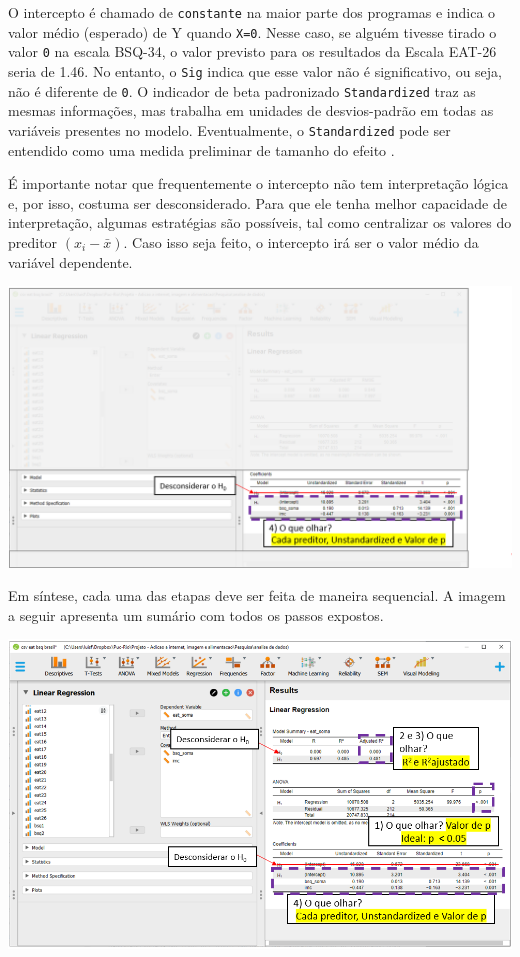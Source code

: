 \documentclass[
]{book}
\begin{document}
O intercepto é chamado de \texttt{constante} na maior parte dos programas e indica o valor médio (esperado) de Y quando \texttt{X=0}. Nesse caso, se alguém tivesse tirado o valor \texttt{0} na escala BSQ-34, o valor previsto para os resultados da Escala EAT-26 seria de 1.46. No entanto, o \texttt{Sig} indica que esse valor não é significativo, ou seja, não é diferente de \texttt{0}. O indicador de beta padronizado \texttt{Standardized} traz as mesmas informações, mas trabalha em unidades de desvios-padrão em todas as variáveis presentes no modelo. Eventualmente, o \texttt{Standardized} pode ser entendido como uma medida preliminar de tamanho do efeito \citep{fox2016}.

É importante notar que frequentemente o intercepto não tem interpretação lógica e, por isso, costuma ser desconsiderado. Para que ele tenha melhor capacidade de interpretação, algumas estratégias são possíveis, tal como centralizar os valores do preditor \((x_i-\bar{x})\). Caso isso seja feito, o intercepto irá ser o valor médio da variável dependente.

\includegraphics{./img/cap_reg_multipla_resultado_4.png}

Em síntese, cada uma das etapas deve ser feita de maneira sequencial. A imagem a seguir apresenta um sumário com todos os passos expostos.

\includegraphics{./img/cap_reg_multipla_resultado_5.png}
\end{document}
